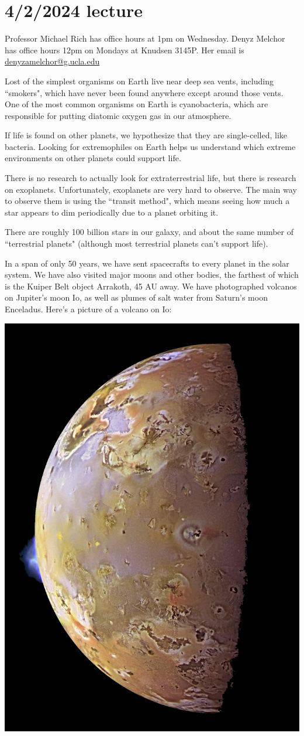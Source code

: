 \documentclass[class=article, crop=false]{standalone}
\begin{document}
\section{4/2/2024 lecture}

Professor Michael Rich has office hours at 1pm on Wednesday.
Denyz Melchor has office hours 12pm on Mondays at Knudsen 3145P. Her email is \url{denyzamelchor@g.ucla.edu}
\par
Lost of the simplest organisms on Earth live near deep sea vents, including ``smokers", which have never been found anywhere except around those vents. One of the most common organisms on Earth is cyanobacteria, which are responsible for putting diatomic oxygen gas in our atmosphere.
\par
If life is found on other planets, we hypothesize that they are single-celled, like bacteria. Looking for extremophiles on Earth helps us understand which extreme environments on other planets could support life.
\par
There is no research to actually look for extraterrestrial life, but there is research on exoplanets. Unfortunately, exoplanets are very hard to observe. The main way to observe them is using the ``transit method", which means seeing how much a star appears to dim periodically due to a planet orbiting it.
\par
There are roughly 100 billion stars in our galaxy, and about the same number of ``terrestrial planets" (although most terrestrial planets can't support life).
\par
In a span of only 50 years, we have sent spacecrafts to every planet in the solar system. We have also visited major moons and other bodies, the farthest of which is the Kuiper Belt object Arrakoth, 45 AU away. We have photographed volcanos on Jupiter's moon Io, as well as plumes of salt water from Saturn's moon Enceladus. Here's a picture of a volcano on Io:
\begin{center}
    \includegraphics[width=.5\textwidth]{Io volcanos.jpg}
\end{center}
\end{document}
